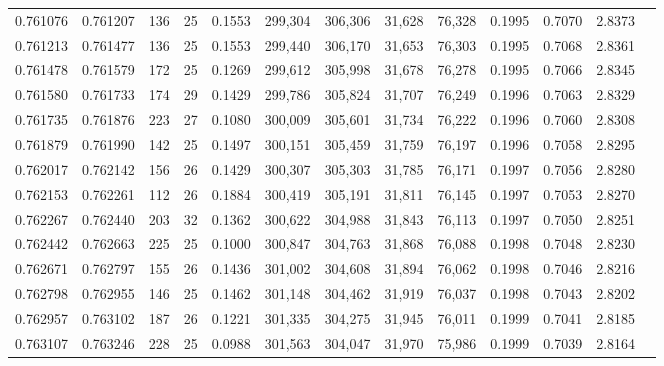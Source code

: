 \begin{tabular}{rrrrrrrrrrrrr}
0.761076 & 0.761207 &   136 &  25 &                                     0.1553 & 299,304 & 306,306 &  31,628 &  76,328 & 0.1995 & 0.7070 & 2.8373 \\
0.761213 & 0.761477 &   136 &  25 &                                     0.1553 & 299,440 & 306,170 &  31,653 &  76,303 & 0.1995 & 0.7068 & 2.8361 \\
0.761478 & 0.761579 &   172 &  25 &                                     0.1269 & 299,612 & 305,998 &  31,678 &  76,278 & 0.1995 & 0.7066 & 2.8345 \\
0.761580 & 0.761733 &   174 &  29 &                                     0.1429 & 299,786 & 305,824 &  31,707 &  76,249 & 0.1996 & 0.7063 & 2.8329 \\
0.761735 & 0.761876 &   223 &  27 &                                     0.1080 & 300,009 & 305,601 &  31,734 &  76,222 & 0.1996 & 0.7060 & 2.8308 \\
0.761879 & 0.761990 &   142 &  25 &                                     0.1497 & 300,151 & 305,459 &  31,759 &  76,197 & 0.1996 & 0.7058 & 2.8295 \\
0.762017 & 0.762142 &   156 &  26 &                                     0.1429 & 300,307 & 305,303 &  31,785 &  76,171 & 0.1997 & 0.7056 & 2.8280 \\
0.762153 & 0.762261 &   112 &  26 &                                     0.1884 & 300,419 & 305,191 &  31,811 &  76,145 & 0.1997 & 0.7053 & 2.8270 \\
0.762267 & 0.762440 &   203 &  32 &                                     0.1362 & 300,622 & 304,988 &  31,843 &  76,113 & 0.1997 & 0.7050 & 2.8251 \\
0.762442 & 0.762663 &   225 &  25 &                                     0.1000 & 300,847 & 304,763 &  31,868 &  76,088 & 0.1998 & 0.7048 & 2.8230 \\
0.762671 & 0.762797 &   155 &  26 &                                     0.1436 & 301,002 & 304,608 &  31,894 &  76,062 & 0.1998 & 0.7046 & 2.8216 \\
0.762798 & 0.762955 &   146 &  25 &                                     0.1462 & 301,148 & 304,462 &  31,919 &  76,037 & 0.1998 & 0.7043 & 2.8202 \\
0.762957 & 0.763102 &   187 &  26 &                                     0.1221 & 301,335 & 304,275 &  31,945 &  76,011 & 0.1999 & 0.7041 & 2.8185 \\
0.763107 & 0.763246 &   228 &  25 &                                     0.0988 & 301,563 & 304,047 &  31,970 &  75,986 & 0.1999 & 0.7039 & 2.8164 \\

\end{tabular}
